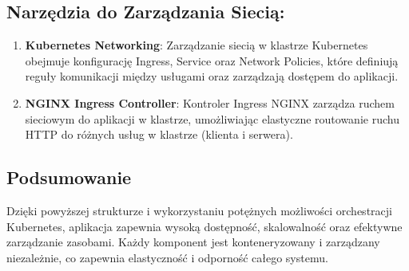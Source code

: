 \documentclass[12pt,a4paper]{article}
\begin{document}
\subsection*{Narzędzia do Zarządzania Siecią:}

\begin{enumerate}
    \item \textbf{Kubernetes Networking}: Zarządzanie siecią w klastrze Kubernetes obejmuje konfigurację Ingress, Service oraz Network Policies, które definiują reguły komunikacji między usługami oraz zarządzają dostępem do aplikacji.
    
    \item \textbf{NGINX Ingress Controller}: Kontroler Ingress NGINX zarządza ruchem sieciowym do aplikacji w klastrze, umożliwiając elastyczne routowanie ruchu HTTP do różnych usług w klastrze (klienta i serwera).
\end{enumerate}

\subsection{Podsumowanie}
\label{sec:ExampleResults}
Dzięki powyższej strukturze i wykorzystaniu potężnych możliwości orchestracji Kubernetes, aplikacja zapewnia wysoką dostępność, skalowalność oraz efektywne zarządzanie zasobami. Każdy komponent jest konteneryzowany i zarządzany niezależnie, co zapewnia elastyczność i odporność całego systemu.

\noindent



\nocite{*}
\end{document}
